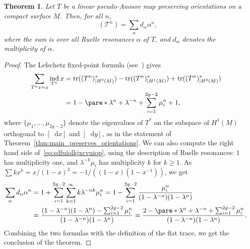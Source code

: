 \documentclass[11pt, a4paper, oneside, final, pagebackref]{amsart}
\newcommand{\boT}{\mathcal{T}}
\newcommand{\dd}{\mathop{}\!\mathrm{d}}
\newcommand{\restr}{|}
\DeclareMathOperator{\ind}{ind}
\DeclareMathOperator{\flattr}{\mathrm{tr}^{\flat}}
\DeclareMathOperator{\tr}{tr}
\renewcommand{\geq}{\geqslant}
\newtheorem{thm}{Theorem}[section]
\theoremstyle{definition}
\numberwithin{equation}{section}
\begin{document}
\begin{thm}
\label{thm:trace_formula} Let $T$ be a linear pseudo-Anosov map preserving
orientations on a compact surface $M$. Then, for all $n$,
\begin{equation}
\label{eq:sdfuiolkjxcvuiop}
  \flattr(\boT^n) = \sum_\alpha d_\alpha \alpha^n,
\end{equation}
where the sum is over all Ruelle resonances $\alpha$ of $T$, and $d_\alpha$
denotes the multiplicity of $\alpha$.
\end{thm}
\begin{proof}
The Lefschetz fixed-point formula (see~\cite[Theorem~8.6.2]{katok}) gives
\begin{align*}
  \sum_{T^n x = x} \ind_{T^n} x
  &= \tr((T^n)_{\restr H^0(M)}^*) - \tr((T^n)_{\restr H^1(M)}^*) + \tr((T^n)_{\restr H^2(M)}^*)
  \\& = 1 - \pare*{\lambda^n + \lambda^{-n} + \sum_{i=1}^{2g-2} \mu_i^n} + 1,
\end{align*}
where $\{\mu_1,\dotsc, \mu_{2g-2}\}$ denote the eigenvalues of $T^*$ on the
subspace of $H^1(M)$ orthogonal to $[\dd x]$ and $[\dd y]$, as in the
statement of Theorem~\ref{thm:main_preserves_orientations}. We can also
compute the right hand side of~\eqref{eq:sdfuiolkjxcvuiop}, using the
description of Ruelle resonances: $1$ has multiplicity one, and
$\lambda^{-k}\mu_i$ has multiplicity $k$ for $k\geq 1$. As $\sum k x^k =
x/(1-x)^2 = -1/((1-x)(1-x^{-1}))$, we get
\begin{align*}
  \sum_\alpha d_\alpha \alpha^n
  &= 1 + \sum_{i=1}^{2g-2} \sum_{k=1}^\infty k \lambda^{-nk} \mu_i^n
  = 1 - \sum_{i=1}^{2g-2} \frac{\mu_i^n}{(1-\lambda^{-n})(1-\lambda^n)}
  \\&
  = \frac{(1-\lambda^{-n})(1-\lambda^n) - \sum_{i=1}^{2g-2}\mu_i^n}{(1-\lambda^{-n})(1-\lambda^n)}
  = \frac{2 - \pare*{\lambda^n + \lambda^{-n} +\sum_{i=1}^{2g-2}\mu_i^n}}{(1-\lambda^{-n})(1-\lambda^n)}.
\end{align*}
Combining the two formulas with the definition of the flat trace, we get the
conclusion of the theorem.
\end{proof}
\end{document}
